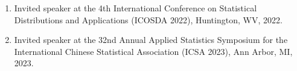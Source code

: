 \documentclass[12pt]{article}
\begin{document}
\begin{enumerate}
		\item Invited speaker at the 4th International Conference on 
		Statistical Distributions and Applications (ICOSDA 2022), 
		Huntington, WV, 2022. 
		
		\item Invited speaker at the 32nd Annual Applied Statistics 
		Symposium for the International Chinese Statistical 
		Association (ICSA 2023), Ann Arbor, MI, 2023.
		
	
	
	
		
		
		
	
		
	
		
		
		
	
		
		
		
		
		
		
	\end{enumerate}
	
\end{document}
